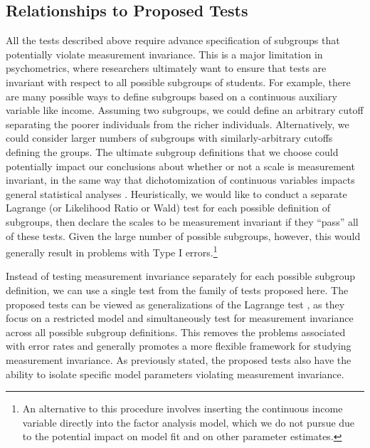 \documentclass[man]{apa}
\begin{document}
\subsection{Relationships to Proposed Tests}
All the tests described above require advance specification of
subgroups that potentially violate measurement invariance.  This is a
major limitation in psychometrics, where researchers
ultimately want to ensure that tests are invariant with respect to all
possible subgroups of students.  For example, there are many possible
ways to define subgroups based on a continuous auxiliary variable like
income.  Assuming two subgroups, we
could define an arbitrary cutoff separating the
poorer individuals from the richer individuals.  Alternatively, we could
consider larger numbers of subgroups with similarly-arbitrary cutoffs
defining the groups.  The ultimate subgroup definitions that we
choose could potentially impact our
conclusions about whether or not a scale is measurement invariant, 
in the same way that dichotomization of continuous variables impacts
general statistical analyses \cite{MacZha02}.
Heuristically, we would like to conduct a separate Lagrange (or
Likelihood Ratio or Wald) test for each possible definition of
subgroups, then declare the scales to be measurement invariant if they
``pass'' all of these tests.  Given the large number of possible
subgroups, however, this would generally result in problems with Type
I errors.\footnote{An alternative to this procedure involves inserting the
continuous income variable directly into the factor analysis model,
which we do not pursue due 
to the potential impact on model fit and on other parameter estimates.}

Instead of testing measurement invariance separately for each possible 
subgroup definition, we can use a single test from the family of tests
proposed here.
The proposed tests can be viewed as generalizations of the
Lagrange test \cite{And93}, 
as they focus on a restricted model and 
simultaneously test for measurement invariance across all
possible subgroup definitions.  This removes the problems associated
with error rates and generally promotes a more flexible framework
for studying measurement invariance.  As previously stated, the proposed
tests also have the ability to isolate specific model parameters violating
measurement invariance.
\end{document}
